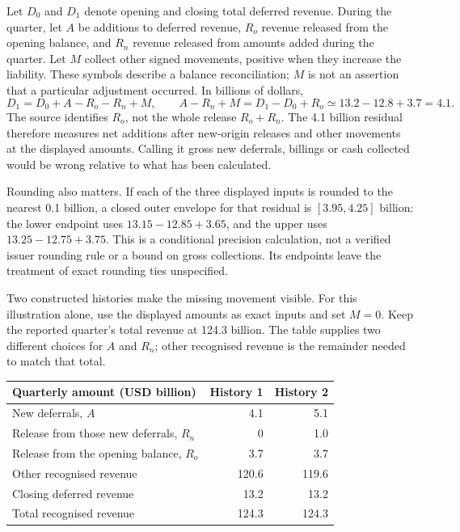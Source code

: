 Let $D_0$ and $D_1$ denote opening and closing total deferred revenue. During
the quarter, let $A$ be additions to deferred revenue, $R_o$ revenue released
from the opening balance, and $R_n$ revenue released from amounts added during
the quarter. Let $M$ collect other signed movements, positive when they increase
the liability. These symbols describe a balance reconciliation; $M$ is not an
assertion that a particular adjustment occurred. In billions of dollars,
\begin{equation}
 D_1=D_0+A-R_o-R_n+M,
 \qquad A-R_n+M=D_1-D_0+R_o\simeq13.2-12.8+3.7=4.1.
 \label{eq:apple-deferred-movement}
\end{equation}
The source identifies $R_o$, not the whole release $R_o+R_n$. The 4.1 billion
residual therefore measures net additions after new-origin releases and other
movements at the displayed amounts. Calling it gross new deferrals, billings
or cash collected would be wrong relative to what has been calculated.

Rounding also matters. If each of the three displayed inputs is rounded to the
nearest 0.1 billion, a closed outer envelope for that residual is
$[3.95,4.25]$ billion: the lower endpoint uses $13.15-12.85+3.65$, and the
upper uses $13.25-12.75+3.75$. This is a conditional precision calculation,
not a verified issuer rounding rule or a bound on gross collections. Its
endpoints leave the treatment of exact rounding ties unspecified.

Two constructed histories make the missing movement visible. For this
illustration alone, use the displayed amounts as exact inputs and set $M=0$.
Keep the reported quarter's total revenue at 124.3 billion. The table supplies
two different choices for $A$ and $R_n$; other recognised revenue is the
remainder needed to match that total.

\begin{center}
\begin{tabularx}{\linewidth}{@{}Xrr@{}}
\toprule
Quarterly amount (USD billion) & History 1 & History 2\\\midrule
New deferrals, $A$ & 4.1 & 5.1\\
Release from those new deferrals, $R_n$ & 0 & 1.0\\
Release from the opening balance, $R_o$ & 3.7 & 3.7\\
Other recognised revenue & 120.6 & 119.6\\
Closing deferred revenue & 13.2 & 13.2\\
Total recognised revenue & 124.3 & 124.3\\\bottomrule
\end{tabularx}
\end{center}

